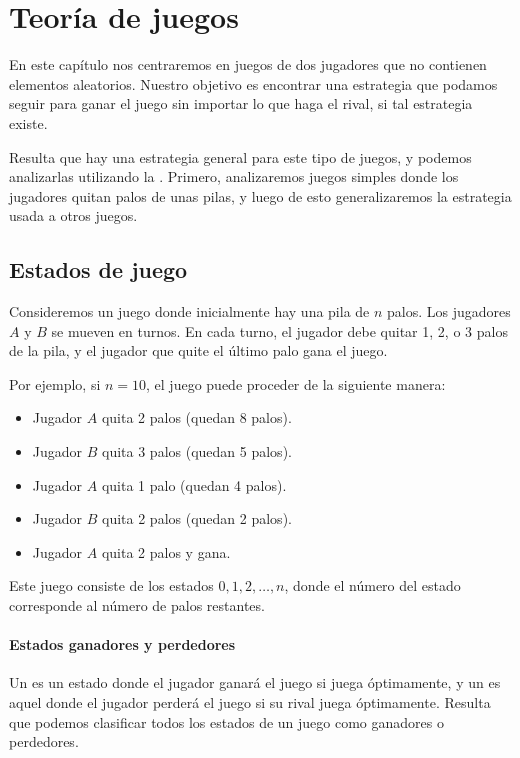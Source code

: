 \chapter{Teoría de juegos}

En este capítulo nos centraremos en juegos de dos jugadores que no
contienen elementos aleatorios. Nuestro objetivo es encontrar una
estrategia que podamos seguir para ganar el juego sin importar lo
que haga el rival, si tal estrategia existe.

Resulta que hay una estrategia general para este tipo de juegos,
y podemos analizarlas utilizando la . Primero,
analizaremos juegos simples donde los jugadores quitan palos de
unas pilas, y luego de esto generalizaremos la estrategia usada
a otros juegos.

\section{Estados de juego}

Consideremos un juego donde inicialmente hay una pila de $n$ palos.
Los jugadores $A$ y $B$ se mueven en turnos. En cada turno, el jugador
debe quitar 1, 2, o 3 palos de la pila, y el jugador que quite el
último palo gana el juego.

Por ejemplo, si $n=10$, el juego puede proceder de la siguiente manera:
\begin{itemize}[noitemsep]
    \item Jugador $A$ quita 2 palos (quedan 8 palos).
    \item Jugador $B$ quita 3 palos (quedan 5 palos).
    \item Jugador $A$ quita 1 palo (quedan 4 palos).
    \item Jugador $B$ quita 2 palos (quedan 2 palos).
    \item Jugador $A$ quita 2 palos y gana.
\end{itemize}

Este juego consiste de los estados $0,1,2,\ldots,n$, donde el número
del estado corresponde al número de palos restantes.

\subsubsection{Estados ganadores y perdedores}


Un  es un estado donde el jugador ganará el juego si
juega óptimamente, y un  es aquel donde el jugador
perderá el juego si su rival juega óptimamente. Resulta que podemos
clasificar todos los estados de un juego como ganadores o perdedores.

